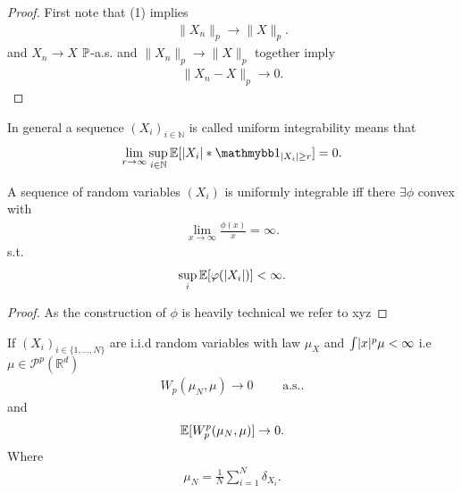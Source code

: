\begin{proof}
  First note that  (1) implies 
  \begin{align*}
    \|X_n\|_p \to  \|X\|_p
  .\end{align*}
  and $X_n \to  X$ $\P$-a.s. and $\|X_n\|_p \to \|X\|_p$ together imply
  \begin{align*}
    \|X_n -X\|_p \to 0
  .\end{align*}
\end{proof}
\begin{remark}
  In general a sequence $(X_i)_{i \in  \mathbb{N}}$ is called uniform integrability means that 
 \begin{align*}
   \lim_{r \to  \infty} \sup_{i \in  \mathbb{N}} \E[\abs{X_i}*\cha_{\abs{X_i}\ge r}] = 0
 .\end{align*}
\end{remark}
\begin{lemma}\label{de_la_valle}
 A sequence of random variables $(X_i)$  is uniformly integrable iff there 
 $\exists \phi $ convex with
 \begin{align*}
   \lim_{x \to \infty} \frac{\phi(x)}{x} = \infty
 .\end{align*}
s.t.
\begin{align*}
 \sup_i \E[\phi(\abs{X_i})] < \infty
.\end{align*}
\end{lemma}
\begin{proof}
  As the construction of $\phi $ is heavily technical we refer to xyz
\end{proof}
\begin{corollary}\label{wasserstein_convergence_arb}
  If $(X_i)_{i \in \{1,\ldots ,N\}  }$  are i.i.d random variables with law $\mu_X$ and $\int \abs{x}^{p} \mu  < \infty $ i.e $\mu  \in  \mathcal{P}^p(\mathbb{R}^{d} ) $
 \begin{align*} 
 W_p(\mu_N,\mu ) \to  0 \qquad \text{ a.s.}
 .\end{align*}
 and 
 \begin{align*}
   \E[W_p^{p}(\mu_N,\mu ) ] \to 0
 .\end{align*}
 Where 
 \begin{align*}
   \mu_N = \frac{1}{N} \sum_{i=1}^{N} \delta_{X_i} 
 .\end{align*}
\end{corollary}
